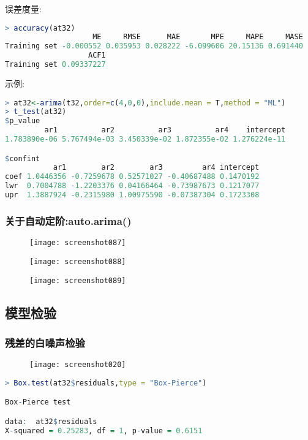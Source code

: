 \documentclass[11pt,a4paper,oneside]{book}
\begin{document}
误差度量:
\begin{lstlisting}[language=r]
> accuracy(at32)
                    ME     RMSE      MAE       MPE     MAPE     MASE
Training set -0.000552 0.035953 0.028222 -6.099606 20.15136 0.691440
                   ACF1
Training set 0.09337227
\end{lstlisting}
示例:
\begin{lstlisting}[language=r]
> at32<-arima(t32,order=c(4,0,0),include.mean = T,method = "ML")
> t_test(at32)
$p_value
         ar1          ar2          ar3          ar4    intercept 
1.783890e-06 5.767494e-03 3.450339e-02 1.872355e-02 1.276224e-11 

$confint
           ar1        ar2        ar3         ar4 intercept
coef 1.0446356 -0.7259678 0.52571027 -0.40687488 0.1470192
lwr  0.7004788 -1.2203376 0.04166464 -0.73987673 0.1217077
upr  1.3887924 -0.2315980 1.00975590 -0.07387304 0.1723308
\end{lstlisting}

\subsubsection{关于自动定阶:auto.arima()}
\begin{figure}[H]
	\centering
	\texttt{[image: screenshot087]}
	\label{fig:screenshot087}
\end{figure}
\begin{figure}[H]
	\centering
	\texttt{[image: screenshot088]}
	\label{fig:screenshot088}
\end{figure}
\begin{figure}[H]
	\centering
	\texttt{[image: screenshot089]}
	\label{fig:screenshot089}
\end{figure}


\subsection{模型检验}

\subsubsection{残差的白噪声检验}
\begin{figure}[H]
	\texttt{[image: screenshot020]}
\end{figure}
\begin{lstlisting}[language=r]
> Box.test(at32$residuals,type = "Box-Pierce")

Box-Pierce test

data:  at32$residuals
X-squared = 0.25283, df = 1, p-value = 0.6151
\end{lstlisting}
\end{document}

